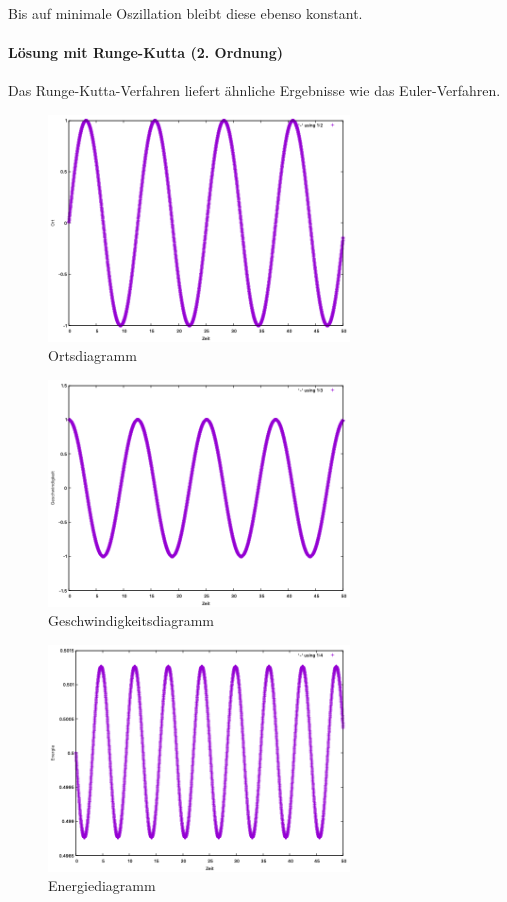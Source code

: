 \documentclass[
    oneside,
    ngerman,
    footinclude=false,
    captions=tableheading,
    DIV=12
]{scrartcl}
\begin{document}
                Bis auf minimale Oszillation bleibt diese ebenso konstant.

            \paragraph*{Lösung mit Runge-Kutta (2. Ordnung)}
                Das Runge-Kutta-Verfahren liefert ähnliche Ergebnisse wie das Euler-Verfahren.
                \begin{figure}[H]
                    \centering
                    \includegraphics[width=8cm]{Bilddateien/impEulerA1(a)-001h-x.png}
                    \caption{Ortsdiagramm}
                \end{figure}
                \begin{figure}[H]
                    \centering
                    \includegraphics[width=8cm]{Bilddateien/impEulerA1(a)-001h-v.png}
                    \caption{Geschwindigkeitsdiagramm}
                \end{figure}
                \begin{figure}[H]
                    \centering
                    \includegraphics[width=8cm]{Bilddateien/impEulerA1(a)-001h-E.png}
                    \caption{Energiediagramm}
                \end{figure}
\end{document}
